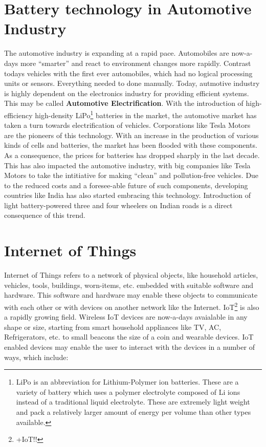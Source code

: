 \documentclass[]{book}
\begin{document}
\section{Battery technology in Automotive
Industry}\label{battery-technology-in-automotive-industry}

The automotive industry is expanding at a rapid pace. Automobiles are
now-a-days more ``smarter'' and react to environment changes more
rapidly. Contrast todays vehicles with the first ever automobiles, which
had no logical processing units or sensors. Everything needed to done
manually. Today, autmotive industry is highly dependent on the
electronics industry for providing efficient systems. This may be called
\textbf{Automotive Electrification}. With the introduction of
high-efficiency high-density LiPo\footnote{LiPo is an abbreviation for
  Lithium-Polymer ion batteries. These are a variety of battery which
  uses a polymer electrolyte composed of Li ions instead of a
  traditional liquid electrolyte. These are extremely light weight and
  pack a relatively larger amount of energy per volume than other types
  available.} batteries in the market, the automotive market has taken a
turn towards electrification of vehicles. Corporations like Tesla Motors
are the pioneers of this technology. With an increase in the production
of various kinds of cells and batteries, the market has been flooded
with these components. As a consequence, the prices for batteries has
dropped sharply in the last decade. This has also impacted the
automotive industry, with big companies like Tesla Motors to take the
intitiative for making ``clean'' and pollution-free vehicles. Due to the
reduced costs and a foresee-able future of such components, developing
countries like India has also started embracing this technology.
Introduction of light battery-powered three and four wheelers on Indian
roads is a direct consequence of this trend.

\section{Internet of Things}\label{internet-of-things}

Internet of Things refers to a network of physical objects, like
household articles, vehicles, tools, buildings, worn-items, etc.
embedded with suitable software and hardware. This software and hardware
may enable these objects to communicate with each other or with devices
on another network like the Internet. IoT\footnote{+IoT!!} is also a
rapidly growing field. Wireless IoT devices are now-a-days avaialable in
any shape or size, starting from smart household appliances like TV, AC,
Refrigerators, etc. to small beacons the size of a coin and wearable
devices. IoT enabled devices may enable the user to interact with the
devices in a number of ways, which include:
\end{document}
